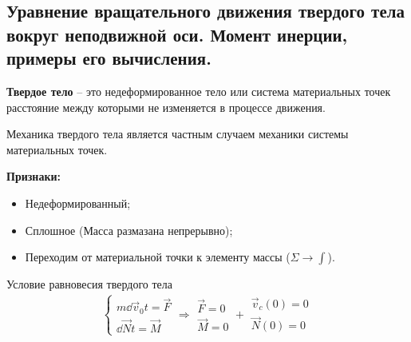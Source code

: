 \subsection{\textbf{Уравнение вращательного движения твердого тела вокруг неподвижной оси. Момент инерции, примеры его вычисления.}}

\textbf{Твердое тело} -- это недеформированное тело или система материальных точек расстояние между которыми не изменяется в процессе движения.

Механика твердого тела является частным случаем механики системы материальных точек.

\textbf{Признаки:}
\begin{itemize}
	\item Недеформированный;
	\item Сплошное (Масса размазана непрерывно);
	\item Переходим от материальной точки к элементу массы ($\Sigma \to \int$).
\end{itemize}

\begin{tbox}{Условие равновесия твердого тела}
	\begin{align*}
		\begin{cases}
			m \dd{\vec{v}_0}{t} = \vec{F} \\
			\dd{\vec{N}}{t} = \vec{M}
		\end{cases} \Rightarrow
		\begin{matrix}
			\vec{F} = 0\\ \vec{M} = 0
		\end{matrix} + \begin{matrix}
		\vec{v}_c(0) = 0\\
		\vec{N}(0) = 0
		\end{matrix}
	\end{align*}
\end{tbox}
